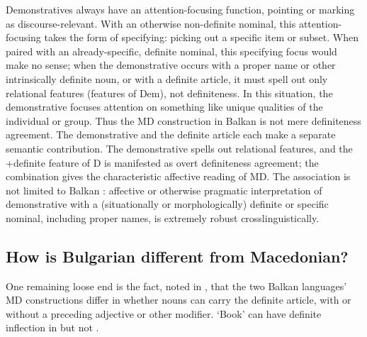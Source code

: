 \documentclass[output=paper]{langscibook}
\begin{document}
\noindent Demonstratives always have an attention-focusing function, pointing or marking as discourse-relevant. With an otherwise non-definite nominal, this atten\-tion-fo\-cusing takes the form of specifying: picking out a specific item or subset. When paired with an already-specific, definite nominal, this specifying focus would make no sense; when the demonstrative occurs with a proper name or other intrinsically definite noun, or with a definite article, it must spell out only relational features (features of Dem), not definiteness. In this situation, the demonstrative focuses attention on something like unique qualities of the individual or group. Thus the MD construction in Balkan  is not mere definiteness agreement. The demonstrative and the definite article each make a separate semantic contribution. The demonstrative spells out relational features, and the +definite feature of D is manifested as overt definiteness agreement; the combination gives the characteristic affective reading of MD. The association is not limited to Balkan : affective or otherwise pragmatic interpretation of demonstrative with a (situationally or morphologically) definite or specific nominal, including proper names, is extremely robust crosslinguistically.

\subsection{How is Bulgarian different from Macedonian?}
One remaining loose end is the fact, noted in , that the two Balkan  languages' MD constructions differ in whether nouns can carry the definite article, with or without a preceding adjective or other modifier. ‘Book’ can have definite inflection in   but not  .
\end{document}
